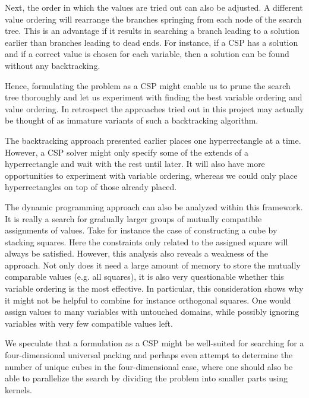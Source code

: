 Next, the order in which the values are tried out can also be adjusted. A different value ordering will rearrange the branches springing from each node of the search tree. This is an advantage if it results in searching a branch leading to a solution earlier than branches leading to dead ends. For instance, if a CSP has a solution and if a correct value is chosen for each variable, then a solution can be found without any backtracking.

Hence, formulating the problem as a CSP might enable us to prune the search tree thoroughly and let us experiment with finding the best variable ordering and value ordering. In retrospect the approaches tried out in this project may actually be thought of as immature variants of such a backtracking algorithm.

The backtracking approach presented earlier places one hyperrectangle at a time. However, a CSP solver might only specify some of the extends of a hyperrectangle and wait with the rest until later. It will also have more opportunities to experiment with variable ordering, whereas we could only place hyperrectangles on top of those already placed.

The dynamic programming approach can also be analyzed within this framework. It is really a search for gradually larger groups of mutually compatible assignments of values. Take for instance the case of constructing a cube by stacking squares. Here the constraints only related to the assigned square will always be satisfied. However, this analysis also reveals a weakness of the approach. Not only does it need a large amount of memory to store the mutually comparable values (e.g. all squares), it is also very questionable whether this variable ordering is the most effective. In particular, this consideration shows why it might not be helpful to combine for instance orthogonal squares. One would assign values to many variables with untouched domains, while possibly ignoring variables with very few compatible values left.

We speculate that a formulation as a CSP might be well-suited for searching for a four-dimensional universal packing and perhaps even attempt to determine the number of unique cubes in the four-dimensional case, where one should also be able to parallelize the search by dividing the problem into smaller parts using kernels.

